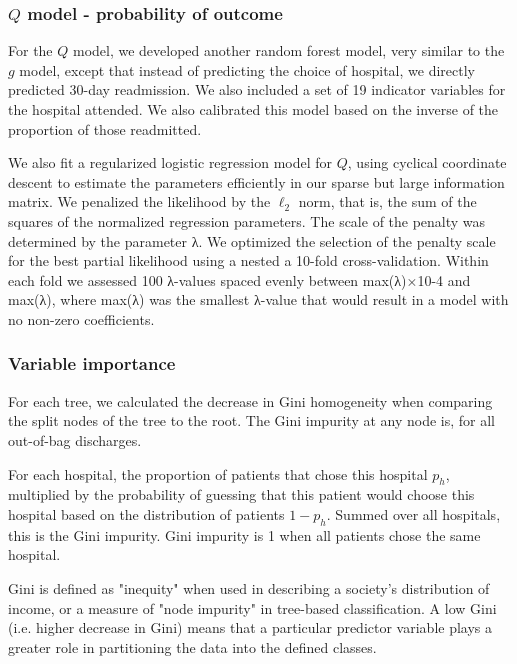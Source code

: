 \documentclass[]{article}\usepackage[]{graphicx}\usepackage[]{color}
\begin{document}
\subsubsection{\(Q\) model - probability of outcome}
For the  \(Q\) model, we developed another random forest model, very similar to the \(g\) model, except that instead of predicting the choice of hospital, we directly predicted 30-day readmission. We also included a set of 19 indicator variables for the hospital attended. We also calibrated this model based on the inverse of the proportion of those readmitted.

We also fit a regularized logistic regression model for \(Q\), using cyclical coordinate descent to estimate the parameters efficiently in our sparse but large information matrix. We penalized the likelihood by the \(\ell_2\) norm, that is, the sum of the squares of the normalized regression parameters. The scale of the penalty was determined by the parameter λ. We optimized the selection of the penalty scale for the best partial likelihood using a nested a 10-fold cross-validation. Within each fold we assessed 100 λ-values spaced evenly between max(λ)×10-4 and max(λ), where max(λ) was the smallest λ-value that would result in a model with no non-zero coefficients.

\subsubsection{Variable importance}
For each tree, we calculated the decrease in Gini homogeneity when comparing the split nodes of the tree to the root. 
The Gini impurity at any node is, for all out-of-bag discharges.

For each hospital, the proportion of patients that chose this hospital $p_h$, multiplied by the probability of guessing that this patient would choose this hospital based on the distribution of patients $1-p_h$. Summed over all hospitals, this is the Gini impurity. Gini impurity is 1 when all patients chose the same hospital.

Gini is defined as "inequity" when used in describing a society's distribution of income, or a measure of "node impurity" in tree-based classification. A low Gini (i.e. higher decrease in Gini) means that a particular predictor variable plays a greater role in partitioning the data into the defined classes. 
\end{document}
